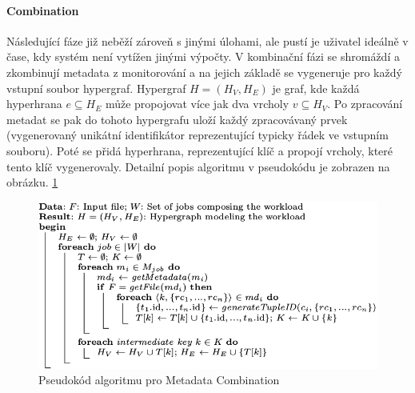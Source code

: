\documentclass[thesis=M,czech]{FITthesis}[2012/06/26]
\begin{document}
\paragraph{Combination}
Následující fáze již neběží zároveň s jinými úlohami, ale pustí je uživatel ideálně v čase, kdy systém není vytížen jinými výpočty. V kombinační fázi se shromáždí a zkombinují metadata z monitorování a na jejich základě se vygeneruje pro každý vstupní soubor hypergraf. Hypergraf $H = (H_V, H_E)$ je graf, kde každá hyperhrana $e \subseteq H_E$ může propojovat více jak dva vrcholy  $v \subseteq H_V$. Po zpracování metadat se pak do tohoto hypergrafu uloží každý zpracovávaný prvek (vygenerovaný unikátní identifikátor reprezentující typicky řádek ve vstupním souboru).  Poté se přidá hyperhrana, reprezentující klíč a propojí vrcholy, které tento klíč vygenerovaly. Detailní popis algoritmu v pseudokódu je zobrazen na obrázku. \ref{fig:alg1}

\begin{figure}\centering
	\includegraphics[width=1\textwidth, angle=0]{files/alg1}
	\caption[Pseudokód algoritmu pro Metadata Combination]
	{Pseudokód algoritmu pro Metadata Combination}\label{fig:alg1}
\end{figure} 
\end{document}
